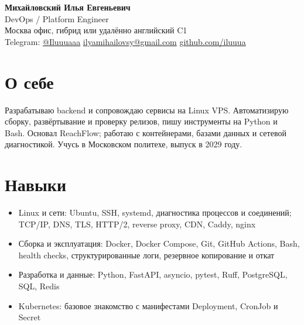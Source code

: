 \documentclass[10pt,a4paper]{article}
\begin{document}
\begin{center}
  {\LARGE\bfseries Михайловский Илья Евгеньевич}\\[2pt]
  {\large DevOps / Platform Engineer}\\[3pt]
  Москва \textperiodcentered{} офис, гибрид или удалённо \textperiodcentered{} английский C1\\[2pt]
  Telegram: \href{https://t.me/Iluuuaaa}{@Iluuuaaa} \textperiodcentered{}
  \href{mailto:ilyamihailovsy@gmail.com}{ilyamihailovsy@gmail.com} \textperiodcentered{}
  \href{https://github.com/iluuua}{github.com/iluuua}
\end{center}

\section{О себе}
Разрабатываю backend и сопровождаю сервисы на Linux VPS. Автоматизирую сборку, развёртывание
и проверку релизов, пишу инструменты на Python и Bash. Основал ReachFlow; работаю с
контейнерами, базами данных и сетевой диагностикой. Учусь в Московском политехе, выпуск в 2029 году.

\section{Навыки}
\begin{itemize}
  \item Linux и сети: Ubuntu, SSH, systemd, диагностика процессов и соединений;
        TCP/IP, DNS, TLS, HTTP/2, reverse proxy, CDN, Caddy, nginx
  \item Сборка и эксплуатация: Docker, Docker Compose, Git, GitHub Actions,
        Bash, health checks, структурированные логи, резервное копирование и откат
  \item Разработка и данные: Python, FastAPI, asyncio, pytest, Ruff, PostgreSQL, SQL, Redis
  \item Kubernetes: базовое знакомство с манифестами Deployment, CronJob и Secret
\end{itemize}
\end{document}
